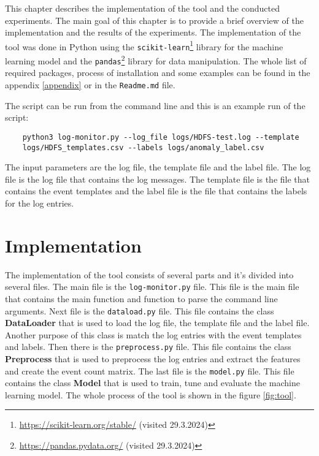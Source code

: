 This chapter describes the implementation of the tool and the conducted experiments. 
The main goal of this chapter is to provide a brief overview of the implementation and the results of the experiments.
The implementation of the tool was done in Python using the \texttt{scikit-learn}\footnote{\url{https://scikit-learn.org/stable/} (visited 29.3.2024)}
library for the machine learning model and the \texttt{pandas}\footnote{\url{https://pandas.pydata.org/} (visited 29.3.2024)} library for data manipulation.
The whole list of required packages, process of installation and some examples can be found in the appendix \ref{appendix} or in the \texttt{Readme.md} file.

The script can be run from the command line and this is an example run of the script:
\begin{verbatim}
    python3 log-monitor.py --log_file logs/HDFS-test.log --template 
    logs/HDFS_templates.csv --labels logs/anomaly_label.csv
\end{verbatim}

The input parameters are the log file, the template file and the label file. The log file is the log file that contains the log messages. 
The template file is the file that contains the event templates and the label file is the file that contains the labels for the log entries.

\section{Implementation}

The implementation of the tool consists of several parts and it's divided into several files. 
The main file is the \texttt{log-monitor.py} file. This file is the main file that contains the main function and function to parse the command line arguments.
Next file is the \texttt{dataload.py} file. This file contains the class \textbf{DataLoader} that is used to load the log file, the template file and the label file. Another
purpose of this class is match the log entries with the event templates and labels.
Then there is the \texttt{preprocess.py} file. This file contains the class \textbf{Preprocess} that is used to preprocess the log entries and extract the features and create the 
event count matrix. 
The last file is the \texttt{model.py} file. This file contains the class \textbf{Model} that is used to train, tune and evaluate the machine learning model.
The whole process of the tool is shown in the figure \ref{fig:tool}.

